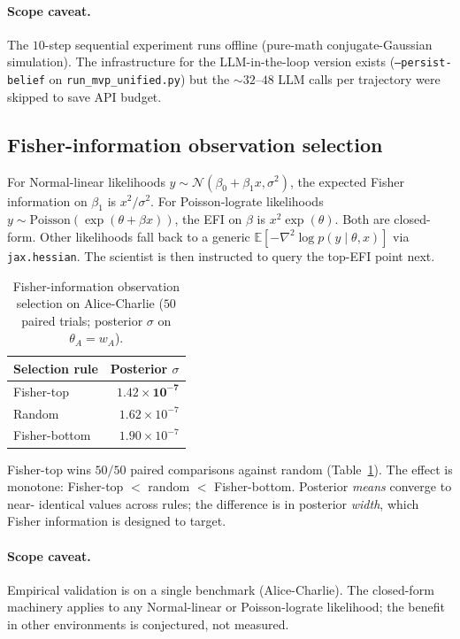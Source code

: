 \documentclass{article}
\begin{document}
\paragraph{Scope caveat.} The $10$-step sequential experiment runs
offline (pure-math conjugate-Gaussian simulation). The infrastructure
for the LLM-in-the-loop version exists
(\texttt{--persist-belief} on \texttt{run\_mvp\_unified.py}) but the
$\sim 32$--$48$ LLM calls per trajectory were skipped to save API
budget.

\subsection{Fisher-information observation selection}
\label{sec:fisher}

For Normal-linear likelihoods $y \sim \mathcal{N}(\beta_{0} +
\beta_{1} x, \sigma^{2})$, the expected Fisher information on
$\beta_{1}$ is $x^{2} / \sigma^{2}$. For Poisson-lograte likelihoods
$y \sim \mathrm{Poisson}(\exp(\theta + \beta x))$, the EFI on $\beta$
is $x^{2} \exp(\theta)$. Both are closed-form. Other likelihoods fall
back to a generic $\mathbb{E}[-\nabla^{2} \log p(y \mid \theta, x)]$
via \texttt{jax.hessian}. The scientist is then instructed to query
the top-EFI point next.

\begin{table}[h]
\centering
\caption{Fisher-information observation selection on Alice-Charlie
($50$ paired trials; posterior $\sigma$ on $\theta_{A} = w_{A}$).}
\label{tab:fisher}
\begin{tabular}{lr}
\toprule
Selection rule  & Posterior $\sigma$ \\
\midrule
Fisher-top    & $\mathbf{1.42 \times 10^{-7}}$ \\
Random        & $1.62 \times 10^{-7}$ \\
Fisher-bottom & $1.90 \times 10^{-7}$ \\
\bottomrule
\end{tabular}
\end{table}

Fisher-top wins $50 / 50$ paired comparisons against random
(Table~\ref{tab:fisher}). The effect is monotone: Fisher-top $<$
random $<$ Fisher-bottom. Posterior \emph{means} converge to near-
identical values across rules; the difference is in posterior
\emph{width}, which Fisher information is designed to target.

\paragraph{Scope caveat.} Empirical validation is on a single
benchmark (Alice-Charlie). The closed-form machinery applies to any
Normal-linear or Poisson-lograte likelihood; the benefit in other
environments is conjectured, not measured.
\end{document}
